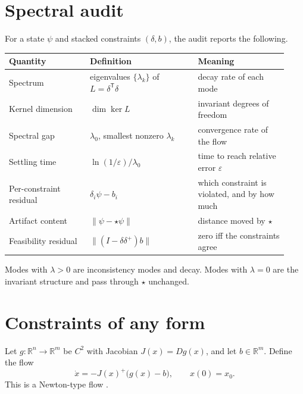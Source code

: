 \documentclass[11pt,letterpaper]{article}
\theoremstyle{plain}
\theoremstyle{definition}
\theoremstyle{remark}
\newcommand{\R}{\mathbb{R}}
\newcommand{\norm}[1]{\lVert #1\rVert}
\newcommand{\pinv}{^{+}}
\newcommand{\tr}{^{\mathsf T}}
\begin{document}
\section{Spectral audit}\label{sec:audit}

For a state $\psi$ and stacked constraints $(\delta,b)$, the audit reports the following.

\begin{center}
\begin{tabular}{@{}>{\raggedright\arraybackslash}p{0.27\linewidth}>{\raggedright\arraybackslash}p{0.36\linewidth}>{\raggedright\arraybackslash}p{0.3\linewidth}@{}}
\toprule
Quantity & Definition & Meaning\\
\midrule
Spectrum & eigenvalues $\{\lambda_k\}$ of $L=\delta\tr\delta$ & decay rate of each mode\\
Kernel dimension & $\dim\ker L$ & invariant degrees of freedom\\
Spectral gap & $\lambda_0$, smallest nonzero $\lambda_k$ & convergence rate of the flow\\
Settling time & $\ln(1/\varepsilon)/\lambda_0$ & time to reach relative error $\varepsilon$\\
Per-constraint residual & $\delta_i\psi-b_i$ & which constraint is violated, and by how much\\
Artifact content & $\norm{\psi-\star\psi}$ & distance moved by $\star$\\
Feasibility residual & $\norm{(I-\delta\delta\pinv)b}$ & zero iff the constraints agree\\
\bottomrule
\end{tabular}
\end{center}

Modes with $\lambda>0$ are inconsistency modes and decay. Modes with $\lambda=0$ are the invariant structure and pass through $\star$ unchanged.

\section{Constraints of any form}\label{sec:general}

Let $g:\R^{n}\to\R^{m}$ be $C^{2}$ with Jacobian $J(x)=Dg(x)$, and let $b\in\R^{m}$. Define the flow
\begin{equation}\label{eq:flow}
\dot x=-J(x)\pinv\bigl(g(x)-b\bigr),\qquad x(0)=x_0 .
\end{equation}
This is a Newton-type flow \cite{nocedal}.
\end{document}
